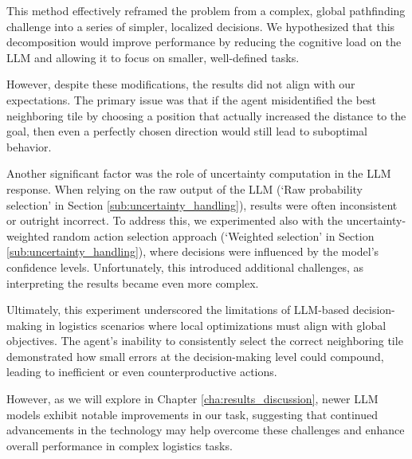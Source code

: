 This method effectively reframed the problem from a complex, global pathfinding
challenge into a series of simpler, localized decisions. We hypothesized that
this decomposition would improve performance by reducing the cognitive load on
the LLM and allowing it to focus on smaller, well-defined tasks.

However, despite these modifications, the results did not align with our expectations.
The primary issue was that if the agent misidentified the best neighboring tile
by choosing a position that actually increased the distance to the goal, then even
a perfectly chosen direction would still lead to suboptimal behavior.

Another significant factor was the role of uncertainty computation in the LLM response.
When relying on the raw output of the LLM (`Raw probability selection' in Section
\ref{sub:uncertainty_handling}), results were often inconsistent or outright incorrect.
To address this, we experimented also with the uncertainty-weighted random action
selection approach (`Weighted selection' in Section
\ref{sub:uncertainty_handling}), where decisions were influenced by the model's
confidence levels. Unfortunately, this introduced additional challenges, as interpreting
the results became even more complex.

Ultimately, this experiment underscored the limitations of LLM-based decision-making
in logistics scenarios where local optimizations must align with global
objectives. The agent's inability to consistently select the correct neighboring
tile demonstrated how small errors at the decision-making level could compound,
leading to inefficient or even counterproductive actions.

However, as we will explore in Chapter \ref{cha:results_discussion}, newer LLM
models exhibit notable improvements in our task, suggesting that continued advancements
in the technology may help overcome these challenges and enhance overall performance
in complex logistics tasks.